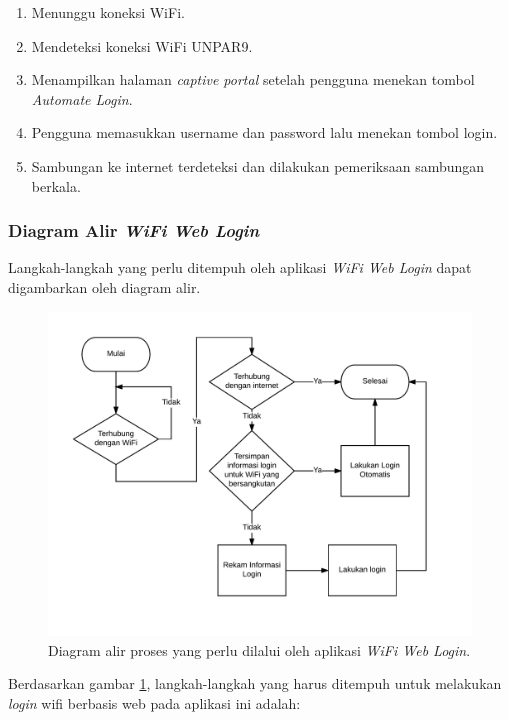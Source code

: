 \begin{enumerate}
    \item{Menunggu koneksi WiFi.}
    \item{Mendeteksi koneksi WiFi UNPAR9.}
    \item{Menampilkan halaman \textit{captive portal} setelah pengguna menekan tombol \textit{Automate Login}.}
    \item{Pengguna memasukkan username dan password lalu menekan tombol login.}
    \item{Sambungan ke internet terdeteksi dan dilakukan pemeriksaan sambungan berkala.}
\end{enumerate}

\subsubsection{Diagram Alir \textit{WiFi Web Login}}
\label{subsubsec:diagram_alir_wifi_web_login}

Langkah-langkah yang perlu ditempuh oleh aplikasi \textit{WiFi Web Login} dapat digambarkan oleh diagram alir.

\begin{figure}[h]
    \centering
    \includegraphics[scale=0.85]{Gambar/WifiWebLogin.png}
    \caption[Diagram alir proses yang perlu dilalui oleh aplikasi \textit{WiFi Web Login}.]{Diagram alir proses yang perlu dilalui oleh aplikasi \textit{WiFi Web Login}.} 
    \label{fig:wifiweblogin}
\end{figure}

Berdasarkan gambar \ref{fig:wifiweblogin}, langkah-langkah yang harus ditempuh untuk melakukan \textit{login} wifi berbasis web pada aplikasi ini adalah:

